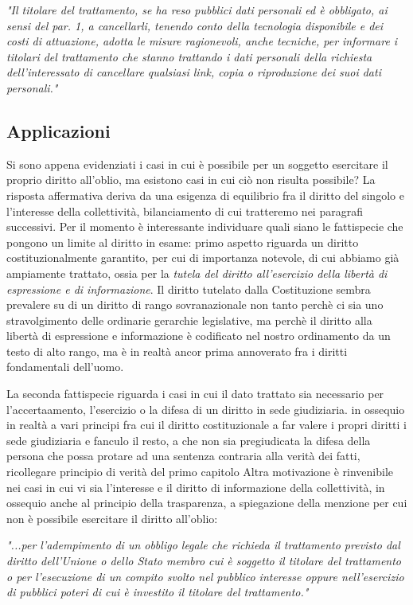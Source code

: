 \textit{"Il titolare del trattamento, se ha reso pubblici dati personali ed è obbligato, ai sensi del par. 1, a cancellarli, tenendo conto della tecnologia disponibile e dei costi di attuazione, adotta le misure ragionevoli, anche tecniche, per informare i titolari del trattamento che stanno trattando i dati personali della richiesta dell'interessato di cancellare qualsiasi link, copia o riproduzione dei suoi dati personali."}

\subsection{Applicazioni}
Si sono appena evidenziati i casi in cui è possibile per un soggetto esercitare il proprio diritto all'oblio, ma esistono casi in cui ciò non risulta possibile? 
La risposta affermativa deriva da una esigenza di equilibrio fra il diritto del singolo e l'interesse della collettività, bilanciamento di cui tratteremo nei paragrafi successivi. 
Per il momento è interessante individuare quali siano le fattispecie che pongono un limite al diritto in esame: primo aspetto riguarda un diritto costituzionalmente garantito, per cui di importanza notevole, di cui abbiamo già ampiamente trattato, ossia per la\textit{ tutela del diritto all'esercizio della libertà di espressione e di informazione}. Il diritto tutelato dalla Costituzione sembra prevalere su di un diritto di rango sovranazionale non tanto perchè ci sia uno stravolgimento delle ordinarie gerarchie legislative, ma perchè il diritto alla libertà di espressione e informazione è codificato nel nostro ordinamento da un testo di alto rango, ma è in realtà ancor prima annoverato fra i diritti fondamentali dell'uomo. 

La seconda fattispecie riguarda i casi in cui il dato trattato sia necessario per l'accertaamento, l'esercizio o la difesa di un diritto in sede giudiziaria. 
in ossequio in realtà a vari principi fra cui il diritto costituzionale a far valere i propri diritti i sede giudiziaria e fanculo il resto, a che non sia pregiudicata la difesa della persona che possa protare ad una sentenza contraria alla verità dei fatti, ricollegare principio di verità del primo capitolo
Altra motivazione è rinvenibile nei casi in cui vi sia l'interesse e il diritto di informazione della collettività, in ossequio anche al principio della trasparenza, a spiegazione della menzione per cui non è possibile esercitare il diritto all'oblio:

\textit{"...per l'adempimento di un obbligo legale che richieda il trattamento previsto dal diritto dell'Unione o dello Stato membro cui è soggetto il titolare del trattamento o per l'esecuzione di un compito svolto nel pubblico interesse oppure nell'esercizio di pubblici poteri di cui è investito il titolare del trattamento."}

